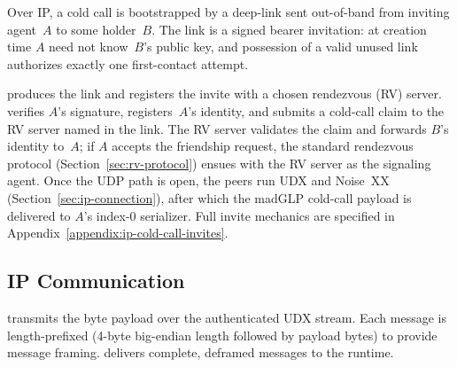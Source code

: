 Over IP, a cold call is bootstrapped by a deep-link sent out-of-band from inviting agent~$A$ to some holder~$B$.  The link is a signed bearer invitation: at creation time $A$ need not know~$B$'s public key, and possession of a valid unused link authorizes exactly one first-contact attempt.

 produces the link and registers the invite with a chosen rendezvous (RV) server.  verifies $A$'s signature, registers~$A$'s identity, and submits a cold-call claim to the RV server named in the link.  The RV server validates the claim and forwards $B$'s identity to~$A$; if $A$ accepts the friendship request, the standard rendezvous protocol (Section~\ref{sec:rv-protocol}) ensues with the RV server as the signaling agent.  Once the UDP path is open, the peers run UDX and Noise~XX (Section~\ref{sec:ip-connection}), after which the madGLP cold-call payload is delivered to $A$'s index-0 serializer.  Full invite mechanics are specified in Appendix~\ref{appendix:ip-cold-call-invites}.

\subsection{IP Communication}
\label{sec:ip-comm}
 transmits the byte payload over the authenticated UDX stream. Each message is length-prefixed (4-byte big-endian length followed by payload bytes) to provide message framing.  delivers complete, deframed messages to the runtime.
